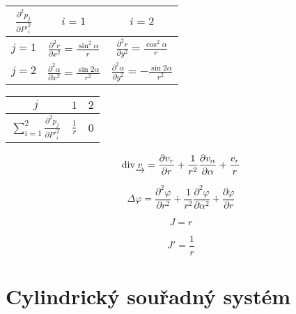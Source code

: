 \begin{tabular}{| c || c | c |}
\hline
\(\frac{\partial^2 p_j}{\partial P'^2_i}\) & \(i=1\) & \(i=2\) \\
\hline
\hline
\(j=1\) & \(\frac{\partial^2 r}{\partial x^2} = \frac{\sin^2 \alpha}{r}\) & \(\frac{\partial^2 r}{\partial y^2} = \frac{\cos^2 \alpha}{r}\) \\
\hline
\(j=2\) & \(\frac{\partial^2 \alpha}{\partial x^2} = \frac{\sin 2\alpha}{r^2}\) & \(\frac{\partial^2 \alpha}{\partial y^2} = -\frac{\sin 2\alpha}{r^2}\) \\
\hline
\end{tabular}

\begin{tabular}{| c || c | c |}
\hline
\(j\) & \(1\) & \(2\) \\
\hline
\hline
\(\sum_{i=1}^2 \frac{\partial^2 p_j}{\partial P'^2_i}\) & \(\frac{1}{r}\) & 0 \\
\hline
\end{tabular}

\begin{equation}
\label{eq:polarni_ss_div}
\mathrm{div}{\underrightarrow{v}} = \frac{\partial v_r}{\partial r} + \frac{1}{r^2} \frac{\partial v_{\alpha}}{\partial \alpha} + \frac{v_r}{r}
\end{equation}

\begin{equation}
\label{eq:polarni_ss_laplace}
\Delta \varphi = \frac{\partial^2 \varphi}{\partial r^2} + \frac{1}{r^2} \frac{\partial^2 \varphi}{\partial \alpha^2} + \frac{\partial \varphi}{\partial r}
\end{equation}

\begin{equation}
\label{eq:polarni_ss_j}
J = r
\end{equation}

\begin{equation}
\label{eq:polarni_ss_j_inv}
J' = \frac{1}{r}
\end{equation}


\section{Cylindrický souřadný systém}

